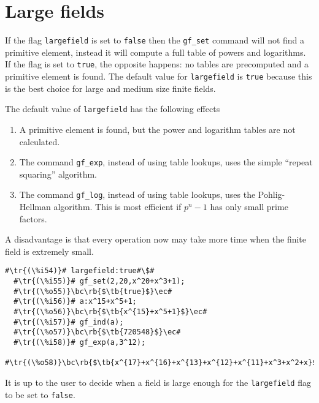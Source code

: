 \documentclass[a4paper,11pt,leqno,fleqn]{artikel3}
\newcommand{\bc}{\begin{center}}
\newcommand{\ec}{\end{center}}
\newcommand{\tr}[1]{\textcolor{red}{#1}}
\newcommand{\tb}[1]{\textcolor{blue}{#1}}
\newcommand{\rb}[1]{\raisebox{2mm}[0mm][1mm]{#1}}
\begin{document}
\section*{Large fields}

If the flag \texttt{largefield} is set to \texttt{false} then
the \texttt{gf\_set} command will not find a primitive element,
instead it will compute a full table of powers and logarithms.
If the flag is set to \texttt{true}, the opposite happens:
no tables are precomputed and a primitive element is found.
The default value for \texttt{largefield} is \texttt{true}
because this is the best choice for large and medium size finite fields.
 

The default value of \texttt{largefield} has the following effects

\begin{enumerate}
\item A primitive element is found, but the power and logarithm tables are not
  calculated.
\item The command \verb!gf_exp!, instead of using table lookups, uses the
  simple ``repeat squaring'' algorithm.
\item The command \verb!gf_log!, instead of using table lookups, uses the
  Pohlig-Hellman algorithm.  This is most efficient if $p^n-1$ has only small
  prime factors.
\end{enumerate}

A disadvantage is that every operation now may take more time
when the finite field is extremely small.

\begin{lstlisting}[escapechar=\#]
  #\tr{(\%i54)}# largefield:true#\$#
  #\tr{(\%i55)}# gf_set(2,20,x^20+x^3+1);
  #\tr{(\%o55)}\bc\rb{$\tb{true}$}\ec#
  #\tr{(\%i56)}# a:x^15+x^5+1;
  #\tr{(\%o56)}\bc\rb{$\tb{x^{15}+x^5+1}$}\ec#
  #\tr{(\%i57)}# gf_ind(a);
  #\tr{(\%o57)}\bc\rb{$\tb{720548}$}\ec#
  #\tr{(\%i58)}# gf_exp(a,3^12);
  #\tr{(\%o58)}\bc\rb{$\tb{x^{17}+x^{16}+x^{13}+x^{12}+x^{11}+x^3+x^2+x}$}\ec#
\end{lstlisting}

It is up to the user to decide when a field is large enough for the
\texttt{largefield} flag to be set to \texttt{false}.
\end{document}
